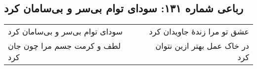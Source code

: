 \begin{center}
\section*{رباعی شماره ۱۳۱: سودای توام بی‌سر و بی‌سامان کرد}
\label{sec:sh131}
\begin{longtable}{l p{0.5cm} r}
سودای توام بی‌سر و بی‌سامان کرد
&&
عشق تو مرا زندهٔ جاویدان کرد
\\
لطف و کرمت جسم مرا چون جان کرد
&&
در خاک عمل بهتر ازین نتوان کرد
\\
\end{longtable}
\end{center}
